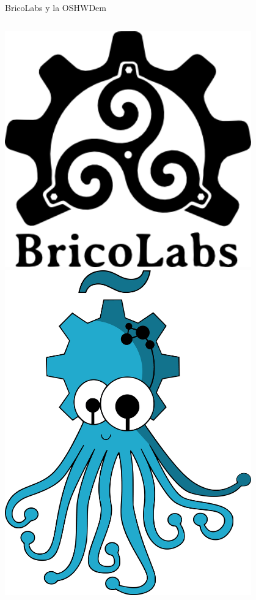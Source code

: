 \documentclass{beamer}
\begin{document}
\begin{frame}{BricoLabs y la OSHWDem}
  \begin{columns}
    \includegraphics [width=0.8\textwidth]{bricolabs_logo.png}
    \includegraphics [width=0.8\textwidth]{OSHWIcolor.png}
  \end{columns}

\end{frame}
\end{document}
